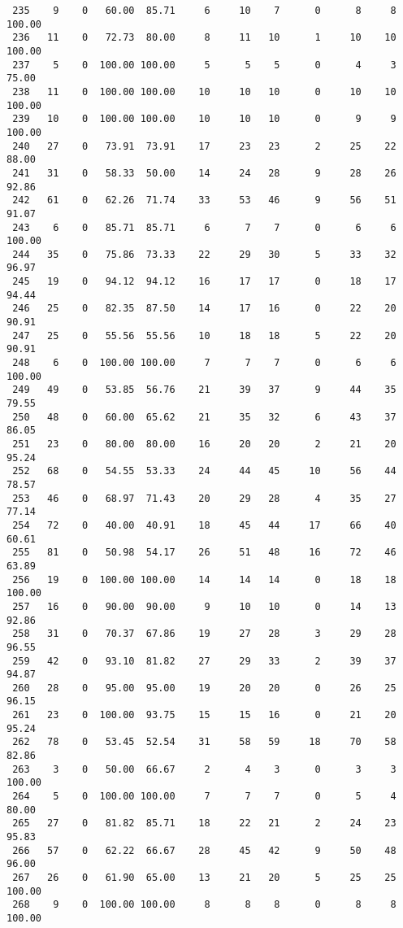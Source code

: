 \begin{verbatim}
 235    9    0   60.00  85.71     6     10    7      0      8     8   100.00
 236   11    0   72.73  80.00     8     11   10      1     10    10   100.00
 237    5    0  100.00 100.00     5      5    5      0      4     3    75.00
 238   11    0  100.00 100.00    10     10   10      0     10    10   100.00
 239   10    0  100.00 100.00    10     10   10      0      9     9   100.00
 240   27    0   73.91  73.91    17     23   23      2     25    22    88.00
 241   31    0   58.33  50.00    14     24   28      9     28    26    92.86
 242   61    0   62.26  71.74    33     53   46      9     56    51    91.07
 243    6    0   85.71  85.71     6      7    7      0      6     6   100.00
 244   35    0   75.86  73.33    22     29   30      5     33    32    96.97
 245   19    0   94.12  94.12    16     17   17      0     18    17    94.44
 246   25    0   82.35  87.50    14     17   16      0     22    20    90.91
 247   25    0   55.56  55.56    10     18   18      5     22    20    90.91
 248    6    0  100.00 100.00     7      7    7      0      6     6   100.00
 249   49    0   53.85  56.76    21     39   37      9     44    35    79.55
 250   48    0   60.00  65.62    21     35   32      6     43    37    86.05
 251   23    0   80.00  80.00    16     20   20      2     21    20    95.24
 252   68    0   54.55  53.33    24     44   45     10     56    44    78.57
 253   46    0   68.97  71.43    20     29   28      4     35    27    77.14
 254   72    0   40.00  40.91    18     45   44     17     66    40    60.61
 255   81    0   50.98  54.17    26     51   48     16     72    46    63.89
 256   19    0  100.00 100.00    14     14   14      0     18    18   100.00
 257   16    0   90.00  90.00     9     10   10      0     14    13    92.86
 258   31    0   70.37  67.86    19     27   28      3     29    28    96.55
 259   42    0   93.10  81.82    27     29   33      2     39    37    94.87
 260   28    0   95.00  95.00    19     20   20      0     26    25    96.15
 261   23    0  100.00  93.75    15     15   16      0     21    20    95.24
 262   78    0   53.45  52.54    31     58   59     18     70    58    82.86
 263    3    0   50.00  66.67     2      4    3      0      3     3   100.00
 264    5    0  100.00 100.00     7      7    7      0      5     4    80.00
 265   27    0   81.82  85.71    18     22   21      2     24    23    95.83
 266   57    0   62.22  66.67    28     45   42      9     50    48    96.00
 267   26    0   61.90  65.00    13     21   20      5     25    25   100.00
 268    9    0  100.00 100.00     8      8    8      0      8     8   100.00

\end{verbatim}
